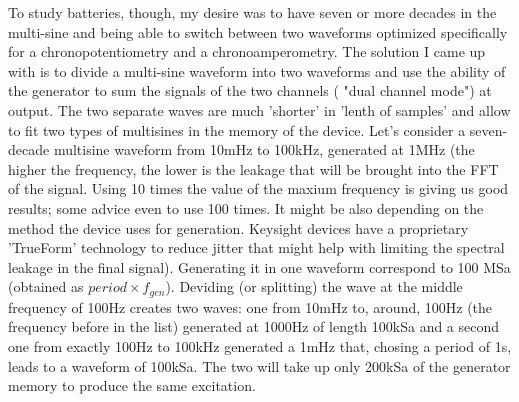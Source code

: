 To study batteries, though, my desire was to have seven or more decades in the multi-sine and being able to switch between two waveforms optimized specifically for a chronopotentiometry and a chronoamperometry. The solution I came up with is to divide a multi-sine waveform into two waveforms and use the ability of the generator to sum the signals of the two channels ( "dual channel mode") at output.  The two separate waves are much 'shorter' in  'lenth of samples' and allow to fit two types of multisines in the memory of the device. Let's consider a seven-decade multisine waveform from 10mHz to 100kHz, generated at 1MHz (the higher the frequency, the lower is the leakage that will be brought into the FFT of the signal. Using 10 times the value of the maxium frequency is giving us good results; some advice even to use 100 times. It might be also depending on the method the device uses for generation. Keysight devices have a proprietary 'TrueForm' technology to reduce jitter that might help with limiting the spectral leakage in the final signal).  Generating it in one waveform correspond to 100 MSa (obtained as $period \times f_{gen}$). Deviding (or splitting) the wave at the middle frequency of 100Hz creates two waves: one from 10mHz to, around, 100Hz (the frequency before in the list) generated at 1000Hz of length 100kSa and a second one from exactly 100Hz to 100kHz generated a 1mHz that, chosing a period of 1s, leads to a waveform of 100kSa. The two will take up only 200kSa of the generator memory to produce the same excitation. \\

